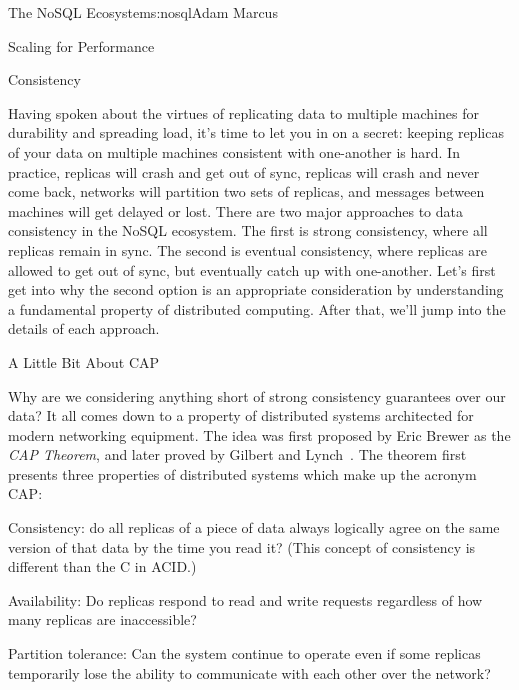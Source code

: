 \begin{aosachapter}{The NoSQL Ecosystem}{s:nosql}{Adam Marcus}
\begin{aosasect1}{Scaling for Performance}
\end{aosasect1}

\begin{aosasect1}{Consistency}
\label{sec.nosql.consistency}

Having spoken about the virtues of replicating data to multiple
machines for durability and spreading load, it's time to let you in on
a secret: keeping replicas of your data on multiple machines
consistent with one-another is hard.  In practice, replicas will crash
and get out of sync, replicas will crash and never come back, networks
will partition two sets of replicas, and messages between machines
will get delayed or lost.  There are two major approaches to data
consistency in the NoSQL ecosystem.  The first is strong consistency, where all
replicas remain in sync.  The second is eventual consistency, where replicas are
allowed to get out of sync, but eventually catch up with one-another.
Let's first get into why the second option is an appropriate
consideration by understanding a fundamental property of distributed
computing.  After that, we'll jump into the details of each approach.

\begin{aosasect2}{A Little Bit About CAP}

Why are we considering anything short of strong consistency guarantees
over our data?  It all comes down to a property of distributed systems
architected for modern networking equipment.  The idea was first
proposed by Eric Brewer as the \emph{CAP Theorem}, and later proved by
Gilbert and Lynch~\cite{bib:captheorem}.  The theorem first presents three
properties of distributed systems which make up the acronym CAP:

\begin{aosadescription}

  \item{Consistency}: do all replicas of a piece of data always
  logically agree on the same version of that data by the time you
  read it?  (This concept of consistency is different than the C in ACID.)

  \item{Availability}: Do replicas respond to read and write requests regardless
  of how many replicas are inaccessible?

  \item{Partition tolerance}: Can the system continue to operate
  even if some replicas temporarily lose the ability to communicate
  with each other over the network?


\end{aosadescription}
\end{aosasect2}
\end{aosasect1}
\end{aosachapter}
